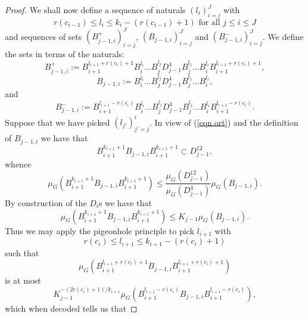\documentclass[12pt]{amsart}
\numberwithin{equation}{section}
\theoremstyle{plain}
\theoremstyle{definition}
\renewcommand{\leq}{\leqslant}
\begin{document}
\begin{proof}
We shall now define a sequence of naturals $(l_i)_{i=j}^J$ with
\begin{equation*}
r(c_{i-1}) \leq l_i \leq k_i - (r(c_{i-1})+1) \textrm{ for all }j \leq i \leq J
\end{equation*}
and sequences of sets $(B_{j-1,i}^+)_{i=j}^J$, $(B_{j-1,i})_{i=j}^J$ and $(B_{j-1,i}^-)_{i=j}^J$.  We define the sets in terms of the naturals:
\begin{equation*}
B_{j-1,i}^+:=B_{i+1}^{l_{i+1}+r(c_{i})+1}B_{i}^{l_{i}}\dots B_{j}^{l_{j}} D_{j-1}^4B_{j}^{l_{j}} \dots B_{i}^{l_{i}}B_{i+1}^{l_{i+1}+r(c_{i})+1},
\end{equation*}
\begin{equation*}
B_{j-1,i}:=B_{i}^{l_{i}}\dots B_{j}^{l_{j}} D_{j-1}^4B_{j}^{l_{j}} \dots B_{i}^{l_{i}},
\end{equation*}
and
\begin{equation*}
B_{j-1,i}^-:=B_{i+1}^{l_{i+1}-r(c_{i})}B_{i}^{l_{i}}\dots B_{j}^{l_{j}} D_{j-1}^4B_{j}^{l_{j}} \dots B_{i}^{l_{i}}B_{i+1}^{l_{i+1}-r(c_{i})}.
\end{equation*}
Suppose that we have picked $(l_{j'})_{j'=j}^i$.  In view of (\ref{eqn.ort}) and the definition of $B_{j-1,i}$ we have that
\begin{equation*}
B_{i+1}^{k_{i+1}+1}B_{j-1,i}B_{i+1}^{k_{i+1}+1} \subset D_{j-1}^{12},
\end{equation*}
whence
\begin{equation*}
\mu_G(B_{i+1}^{k_{i+1}+1}B_{j-1,i}B_{i+1}^{k_{i+1}+1} ) \leq \frac{\mu_G(D_{j-1}^{12})}{\mu_G(D_{j-1}^4)}\mu_G(B_{j-1,i}).
\end{equation*}
By construction of the $D_i$s we have that
\begin{equation*}
\mu_G(B_{i+1}^{k_{i+1}+1}B_{j-1,i}B_{i+1}^{k_{i+1}+1} ) \leq K_{j-1}\mu_G(B_{j-1,i}).
\end{equation*}
Thus we may apply the pigeonhole principle to pick $l_{i+1}$ with
\begin{equation*}
r(c_{i}) \leq l_{i+1} \leq k_{i+1} - (r(c_{i})+1)
\end{equation*}
such that
\begin{equation*}
\mu_G(B_{i+1}^{l_{i+1}+r(c_i)+1}B_{j-1,i}B_{i+1}^{l_{i+1}+r(c_i)+1} ) 
\end{equation*}
is at most
\begin{equation*}
 K_{j-1}^{-(2r(c_i)+1)/k_{i+1}}\mu_G(B_{i+1}^{l_{i+1}-r(c_i)}B_{j-1,i}B_{i+1}^{l_{i+1}-r(c_i)} ),
\end{equation*}
which when decoded tells us that

\end{proof}
\end{document}
